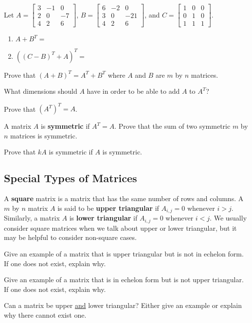 \bq Let $A=\begin{bmatrix} 3&-1&0 \\2&0&-7 \\ 4&2&6 \end{bmatrix}$, $B=\begin{bmatrix} 6&-2&0 \\3&0&-21 \\ 4&2&6 \end{bmatrix}$, \break and $C=\begin{bmatrix} 1&0&0 \\0&1&0\\1&1&1 \end{bmatrix}$.
\begin{enumerate}
\item $A+B^T=$
\item $((C-B)^T+A)^T=$
\end{enumerate}
\eq

\bq Prove that $(A+B)^T=A^T+B^T$ where $A$ and $B$ are $m$ by $n$ matrices.
\eq

\bq What dimensions should $A$ have in order to be able to add $A$ to $A^T$?
\eq

\bq Prove that $(A^T)^T=A$.
\eq

A matrix $A$ is \textbf{symmetric} if $A^T=A$.
\bq Prove that the sum of two symmetric $m$ by $n$ matrices is symmetric.
\eq

\bq Prove that $kA$ is symmetric if $A$ is symmetric. \eq


\subsection{Special Types of Matrices}
A \textbf{square} matrix is a matrix that has the same number of rows and columns. A $m$ by $n$ matrix $A$ is said to be \textbf{upper triangular} if $A_{i,j}=0$ whenever $i>j$. Similarly, a matrix $A$ is \textbf{lower triangular} if $A_{i,j}=0$ whenever $i<j$. We usually consider square matrices when we talk about upper or lower triangular, but it may be helpful to consider non-square cases.

\bq Give an example of a matrix that is upper triangular but is not in echelon form. If one does not exist, explain why.
\eq

\bq Give an example of a matrix that is in echelon form but is not upper triangular. If one does not exist, explain why.
\eq

\bq Can a matrix be upper \underline{and} lower triangular? Either give an example or explain why there cannot exist one.
\eq

